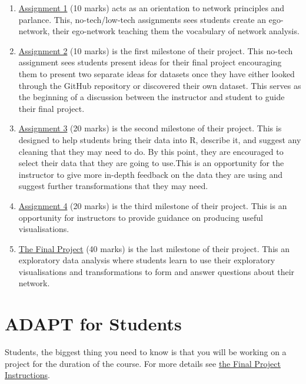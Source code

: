 \documentclass[
  letterpaper,
  DIV=11,
  numbers=noendperiod]{scrreprt}
\begin{document}
\begin{enumerate}
\def\labelenumi{\arabic{enumi}.}
\item
  \href{A1_My\%20Ego\%20Network.qmd}{Assignment 1} (10 marks) acts as an
  orientation to network principles and parlance. This, no-tech/low-tech
  assignments sees students create an ego-network, their ego-network
  teaching them the vocabulary of network analysis.
\item
  \href{A2_Project\%20Prospectus.qmd}{Assignment 2} (10 marks) is the
  first milestone of their project. This no-tech assignment sees
  students present ideas for their final project encouraging them to
  present two separate ideas for datasets once they have either looked
  through the GitHub repository or discovered their own dataset. This
  serves as the beginning of a discussion between the instructor and
  student to guide their final project.
\item
  \href{A3_Data_Exploration.qmd}{Assignment 3} (20 marks) is the second
  milestone of their project. This is designed to help students bring
  their data into R, describe it, and suggest any cleaning that they may
  need to do. By this point, they are encouraged to select their data
  that they are going to use.This is an opportunity for the instructor
  to give more in-depth feedback on the data they are using and suggest
  further transformations that they may need.
\item
  \href{A4_Visualisations.qmd}{Assignment 4} (20 marks) is the third
  milestone of their project. This is an opportunity for instructors to
  provide guidance on producing useful visualisations.
\item
  \href{Final\%20Project\%20Instructions.qmd}{The Final Project} (40
  marks) is the last milestone of their project. This an exploratory
  data analysis where students learn to use their exploratory
  visualisations and transformations to form and answer questions about
  their network.
\end{enumerate}

\section{ADAPT for Students}\label{adapt-for-students}

Students, the biggest thing you need to know is that you will be working
on a project for the duration of the course. For more details see
\href{Final\%20Project\%20Instructions.qmd}{the Final Project
Instructions}.
\end{document}
